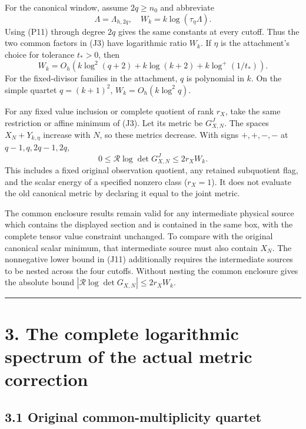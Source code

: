 \documentclass[11pt]{article}
\begin{document}
For the canonical window, assume \(2q\ge n_0\) and abbreviate \[
 \Lambda=\Lambda_{h,2q},\quad
 W_k=k\log(\tau_\eta\Lambda).
\] Using (P11) through degree \(2q\) gives the same constants at every cutoff. Thus the two common factors in (J3) have logarithmic ratio \(W_k\). If \(\eta\) is the attachment's choice for tolerance \(t_*>0\), then \[
 W_k=O_h\!\left(k\log^2(q+2)+k\log(k+2)+k\log^+(1/t_*)\right).
 \tag{J10}
\] For the fixed-divisor families in the attachment, \(q\) is polynomial in \(k\). On the simple quartet \(q=(k+1)^2\), \(W_k=O_h(k\log^2 q)\).

For any fixed value inclusion or complete quotient of rank \(r_X\), take the same restriction or affine minimum of (J3). Let its metric be \(G_{X,N}^J\). The spaces \(X_N+Y_{k,\eta}\) increase with \(N\), so these metrics decrease. With signs \(+,+,-,-\) at \(q-1,q,2q-1,2q\), \[
 \boxed{
 0\le\mathcal R\log\det G_{X,N}^J\le2r_X W_k.
 } \tag{J11}
\] This includes a fixed original observation quotient, any retained subquotient flag, and the scalar energy of a specified nonzero class (\(r_X=1\)). It does not evaluate the old canonical metric by declaring it equal to the joint metric.

The common enclosure results remain valid for any intermediate physical source which contains the displayed section and is contained in the same box, with the complete tensor value constraint unchanged. To compare with the original canonical scalar minimum, that intermediate source must also contain \(X_N\). The nonnegative lower bound in (J11) additionally requires the intermediate sources to be nested across the four cutoffs. Without nesting the common enclosure gives the absolute bound \(|\mathcal R\log\det G_{X,N}|\le 2r_XW_k\).

\begin{center}\rule{0.5\linewidth}{0.5pt}\end{center}

\section{3. The complete logarithmic spectrum of the actual metric correction}\label{the-complete-logarithmic-spectrum-of-the-actual-metric-correction}

\subsection{3.1 Original common-multiplicity quartet}\label{original-common-multiplicity-quartet}
\end{document}
